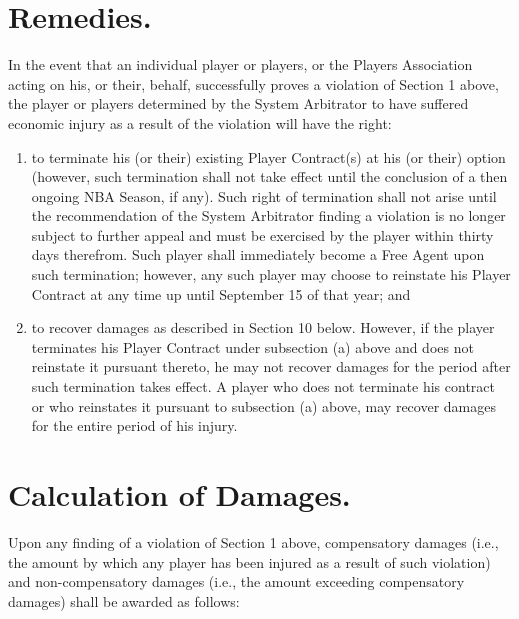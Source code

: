 \documentclass[
]{book}
\providecommand{\tightlist}{%
  \setlength{\itemsep}{0pt}\setlength{\parskip}{0pt}}
\begin{document}
\hypertarget{remedies.}{%
\section{Remedies.}\label{remedies.}}

In the event that an individual player or players, or the Players Association acting on his, or their, behalf, successfully proves a violation of Section 1 above, the player or players determined by the System Arbitrator to have suffered economic injury as a result of the violation will have the right:

\begin{enumerate}
\def\labelenumi{(\alph{enumi})}
\tightlist
\item
  to terminate his (or their) existing Player Contract(s) at his (or their) option (however, such termination shall not take effect until the conclusion of a then ongoing NBA Season, if any). Such right of termination shall not arise until the recommendation of the System Arbitrator finding a violation is no longer subject to further appeal and must be exercised by the player within thirty days therefrom. Such player shall immediately become a Free Agent upon such termination; however, any such player may choose to reinstate his Player Contract at any time up until September 15 of that year; and
\item
  to recover damages as described in Section 10 below. However, if the player terminates his Player Contract under subsection (a) above and does not reinstate it pursuant thereto, he may not recover damages for the period after such termination takes effect. A player who does not terminate his contract or who reinstates it pursuant to subsection (a) above, may recover damages for the entire period of his injury.
\end{enumerate}

\hypertarget{calculation-of-damages.}{%
\section{Calculation of Damages.}\label{calculation-of-damages.}}

Upon any finding of a violation of Section 1 above, compensatory damages (i.e., the amount by which any player has been injured as a result of such violation) and non-compensatory damages (i.e., the amount exceeding compensatory damages) shall be awarded as follows:
\end{document}
